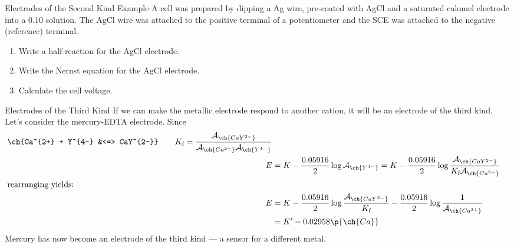\documentclass[notes=show]{beamer}
\begin{document}
\begin{frame}[t]{Electrodes of the Second Kind Example}
	A cell was prepared by dipping a Ag wire, pre-coated with AgCl and a
	saturated calomel electrode into a \SI{0.10}{\Molar}  solution.
	The AgCl wire was attached to the positive terminal of a potentiometer
	and the SCE was attached to the negative (reference) terminal.
	\begin{enumerate}
		\item Write a half-reaction for the AgCl electrode.
		\item Write the Nernst equation for the AgCl electrode.
		\item Calculate the cell voltage.
			\visible<2->{\textbf{Activity?}}
	\end{enumerate}

\end{frame}

\clearpage
	
\begin{frame}{Electrodes of the Third Kind}
		If we can make the metallic electrode
			respond to another cation, it will be an
			electrode of the third kind. Let's
			consider the mercury-EDTA electrode.
			Since
			\begin{align*}
				\ch{Ca^{2+} + Y^{4-} &<=>
				CaY^{2-}} \qquad K_{\text{f}} =
				\frac{\mathcal{A}_{\ch{CaY^{2-}}}}
				{\mathcal{A}_{\ch{Ca^{2+}}}
				\mathcal{A}_{\ch{Y^{4-}}}} \\
				E &= K - \frac{0.05916}{2} \log
				\mathcal{A}_{\ch{Y^{4-}}}
				= K - \frac{0.05916}{2} \log
				\frac{\mathcal{A}_{\ch{CaY^{2-}}}}
				{K_{\text{f}}\mathcal{A}_{\ch{Ca^{2+}}}
				} \\
				\intertext{rearranging yields:}
				E &= K - \frac{0.05916}{2} \log \frac{\mathcal{A}_{\ch{CaY^{2-}}}}
				{K_{\text{f}}} -
				\frac{0.05916}{2} \log
				\frac{1}{\mathcal{A}_{\ch{Ca^{2+}}}}
				\\
				&= K' - 0.02958\p{\ch{Ca}}
			\end{align*}
			Mercury has now become an electrode of
			the third kind --- a sensor for a
			different metal.
\end{frame}
\end{document}
